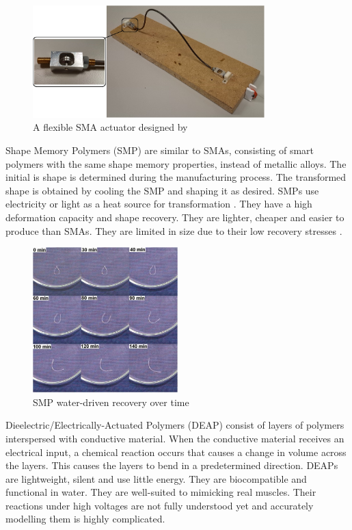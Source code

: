 \begin{figure}[H]
	\centering
	\includegraphics[width=0.8\textwidth]{SMA.png}
	\caption[A flexible SMA actuator]{A flexible SMA actuator designed by \cite{Villoslada2015}}
	\label{fig:sma}
\end{figure}

Shape Memory Polymers (SMP) are similar to SMAs, consisting of smart polymers with the same shape memory properties, instead of metallic alloys. The initial is shape is determined during the manufacturing process. The transformed shape is obtained by cooling the SMP and shaping it as desired. SMPs use electricity or light as a heat source for transformation \citep{Behl2007}. They have a high deformation capacity and shape recovery. They are lighter, cheaper and easier to produce than SMAs. They are limited in size due to their low recovery stresses \citep{Huang2005, Rodriguez2016, Behl2007}.

\begin{figure}[H]
	\centering
	\includegraphics[width=0.5\textwidth]{SMP.png}
	\caption[SMP water-driven recovery]{SMP water-driven recovery over time \citep{Huang2005}}
	\label{fig:smp}
\end{figure}

Dieelectric/Electrically-Actuated Polymers (DEAP) consist of layers of polymers interspersed with conductive material. When the conductive material receives an electrical input, a chemical reaction occurs that causes a change in volume across the layers. This causes the layers to bend in a predetermined direction. DEAPs are lightweight, silent and use little energy. They are biocompatible and functional in water. They are well-suited to mimicking real muscles. Their reactions under high voltages are not fully understood yet and accurately modelling them is highly complicated. \citep{Mutlu2014}

